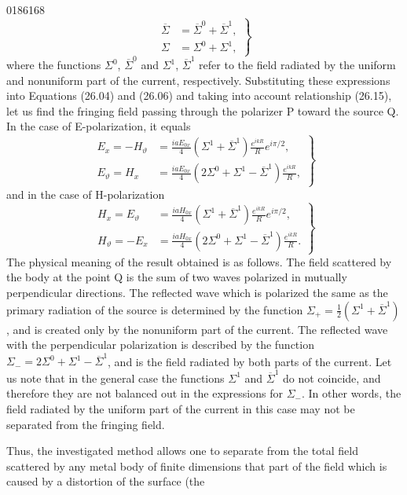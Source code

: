 \begin{scanpage}{0186}{168}
\[
\left.\begin{aligned}\overline\Sigma&=\overline\Sigma^0+\overline\Sigma^1,\\\Sigma&=\Sigma^0+\Sigma^1,
\end{aligned}\right\}\tag{26.16}
\]
where the functions $\Sigma^0$, $\overline\Sigma^0$ and $\Sigma^1$, $\overline\Sigma^1$ refer to the field radiated by the uniform and nonuniform part of the current, respectively. Substituting these expressions into Equations (26.04) and (26.06) and taking into account relationship (26.15), let us find the fringing field passing through the polarizer P toward the source Q. In the case of E-polarization, it equals
\[
\left.\begin{aligned}E_x=-H_\vartheta&=\frac{iaE_{0x}}4(\Sigma^1+\overline\Sigma^1)\frac{e^{ikR}}R e^{i\pi/2},\\
E_\vartheta=H_x&=\frac{iaE_{0x}}4(2\Sigma^0+\Sigma^1-\overline\Sigma^1)\frac{e^{ikR}}R,
\end{aligned}\right\}\tag{26.17}
\]
and in the case of H-polarization
\[
\left.\begin{aligned}H_x=E_\vartheta&=\frac{iaH_{0x}}4(\Sigma^1+\overline\Sigma^1)\frac{e^{ikR}}R e^{i\pi/2},\\
H_\vartheta=-E_x&=\frac{iaH_{0x}}4(2\Sigma^0+\Sigma^1-\overline\Sigma^1)\frac{e^{ikR}}R.
\end{aligned}\right\}\tag{26.18}
\]
The physical meaning of the result obtained is as follows. The field scattered by the body at the point Q is the sum of two waves polarized in mutually perpendicular directions. The reflected wave which is polarized the same as the primary radiation of the source is determined by the function $\Sigma_+=\frac12(\Sigma^1+\overline\Sigma^1)$, and is created only by the nonuniform part of the current. The reflected wave with the perpendicular polarization is described by the function $\Sigma_-=2\Sigma^0+\Sigma^1-\overline\Sigma^1$, and is the field radiated by both parts of the current. Let us note that in the general case the functions $\Sigma^1$ and $\overline\Sigma^1$ do not coincide, and therefore they are not balanced out in the expressions for $\Sigma_-$. In other words, the field radiated by the uniform part of the current in this case may not be separated from the fringing field.

Thus, the investigated method allows one to separate from the total field scattered by any metal body of finite dimensions that part of the field which is caused by a distortion of the surface (the
\end{scanpage}
